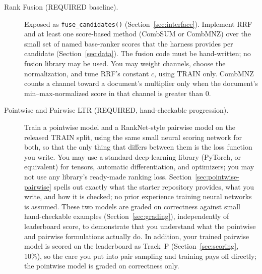 \documentclass[10pt]{article}
\begin{document}
\begin{description}
  \item[Rank Fusion (REQUIRED baseline).]
  Exposed as \texttt{fuse\_candidates()} (Section~\ref{sec:interface}). Implement RRF and at least one score-based method (CombSUM or CombMNZ) over the small set of named base-ranker scores that the harness provides per candidate (Section~\ref{sec:data}). The fusion code must be hand-written; no fusion library may be used. You may weight channels, choose the normalization, and tune RRF's constant \(c\), using TRAIN only. CombMNZ counts a channel toward a document's multiplier only when the document's min--max-normalized score in that channel is greater than 0. %

  \item[Pointwise and Pairwise LTR (REQUIRED, hand-checkable progression).]
  Train a pointwise model and a RankNet-style pairwise model on the released TRAIN split, using the same small neural scoring network for both, so that the only thing that differs between them is the loss function you write. You may use a standard deep-learning library (PyTorch, or equivalent) for tensors, automatic differentiation, and optimizers; you may not use any library's ready-made ranking loss. Section~\ref{sec:pointwise-pairwise} spells out exactly what the starter repository provides, what you write, and how it is checked; no prior experience training neural networks is assumed. These two models are graded on correctness against small hand-checkable examples (Section~\ref{sec:grading}), independently of leaderboard score, to demonstrate that you understand what the pointwise and pairwise formulations actually do. In addition, your trained pairwise model is scored on the leaderboard as Track~P (Section~\ref{sec:scoring}, 10\%), so the care you put into pair sampling and training pays off directly; the pointwise model is graded on correctness only.


\end{description}
\end{document}
